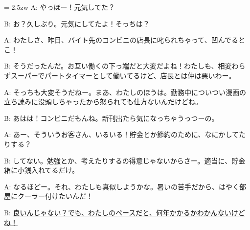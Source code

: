 \documentclass[11pt]{amsart}
\title{}
\author{}
\newenvironment{hangall}[1]{\hangindent = 2.5zw\everypar{\hangindent = 2.5zw}}{}
\begin{document}
\maketitle
\begin{hangall}{}%
A: やっほー！元気してた？

B: お？久しぶり。元気にしてたよ！そっちは？

A: わたしさ、昨日、バイト先のコンビニの店長に叱られちゃって、凹んでるとこ！

B: そうだったんだ。お互い働くの下っ端だと大変だよね！わたしも、相変わらずスーパーでパートタイマーとして働いてるけど、店長とは仲は悪いわー。

A: そっちも大変そうだねー。まあ、わたしのほうは。勤務中についつい漫画の立ち読みに没頭しちゃったから怒られても仕方ないんだけどね。

B: あはは！コンビニだもんね。新刊出たら気になっちゃうっつーの。

A: あー、そういうお客さん、いるいる！貯金とか節約のために、なにかしてたりする？

B: してない。勉強とか、考えたりするの得意じゃないからさー。適当に、貯金箱に小銭入れてるだけ。

A: なるほどー。それ、わたしも真似しようかな。暑いの苦手だから、はやく部屋にクーラー付けたいんだ！

B: \ul{良いんじゃない？でも、わたしのペースだと、何年かかるかわかんないけどね！}\end{hangall}
\end{document}
